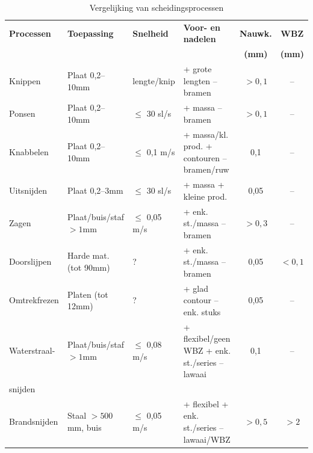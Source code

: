 \documentclass[a4paper,12pt,twoside]{report}
\begin{document}
\begin{table}[ht]
    \centering
    \caption{Vergelijking van scheidingsprocessen}
    \label{tab:scheidingsprocessen}
    \scriptsize
    \setlength{\tabcolsep}{3pt}
    \begin{tabularx}{\textwidth}{@{} l >{\raggedright\arraybackslash}X l >{\raggedright\arraybackslash}X c c @{}}
        \toprule
        \textbf{Processen} & \textbf{Toepassing} & \textbf{Snelheid} & \textbf{Voor- en nadelen} & \textbf{Nauwk.} & \textbf{WBZ} \\
         & & & & \textbf{(mm)} & \textbf{(mm)} \\
        \midrule
        Knippen & Plaat 0,2--10mm & lengte/knip & + grote lengten \newline -- bramen & $>0,1$ & -- \\
        \addlinespace
        Ponsen & Plaat 0,2--10mm & $\le$ 30 sl/s & + massa \newline -- bramen & $>0,1$ & -- \\
        \addlinespace
        Knabbelen & Plaat 0,2--10mm & $\le$ 0,1 m/s & + massa/kl. prod. \newline + contouren \newline -- bramen/ruw & 0,1 & -- \\
        \addlinespace
        Uitsnijden & Plaat 0,2--3mm & $\le$ 30 sl/s & + massa \newline + kleine prod. & 0,05 & -- \\
        \addlinespace
        Zagen & Plaat/buis/staf $>1$mm & $\le$ 0,05 m/s & + enk. st./massa \newline -- bramen & $>0,3$ & -- \\
        \addlinespace
        Doorslijpen & Harde mat. (tot 90mm) & ? & + enk. st./massa \newline -- bramen & 0,05 & $<0,1$ \\
        \addlinespace
        Omtrekfrezen & Platen (tot 12mm) & ? & + glad contour \newline -- enk. stuks & 0,05 & -- \\
        \addlinespace
        Waterstraal- & Plaat/buis/staf $>1$mm & $\le$ 0,08 m/s & + flexibel/geen WBZ \newline + enk. st./series \newline -- lawaai & 0,1 & -- \\
        snijden & & & & & \\
        \addlinespace
        Brandsnijden & Staal $>500$mm, buis & $\le$ 0,05 m/s & + flexibel \newline + enk. st./series \newline -- lawaai/WBZ & $>0,5$ & $>2$ \\

\end{tabularx}
\end{table}
\end{document}
